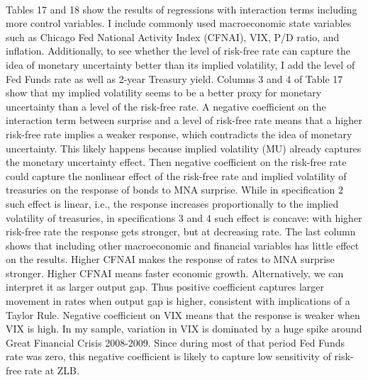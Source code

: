 \documentclass[12pt]{article}
\begin{document}
\paragraph{}
Tables 17 and 18 show the results of regressions with interaction terms including more control variables. I include commonly used macroeconomic state variables such as Chicago Fed National Activity Index (CFNAI), VIX, P/D ratio, and inflation. Additionally, to see whether the level of risk-free rate can capture the idea of monetary uncertainty better than its implied volatility, I add the level of Fed Funds rate as well as 2-year Treasury yield. Columns 3 and 4 of Table 17 show that my implied volatility seems to be a better proxy for monetary uncertainty than a level of the risk-free rate. A negative coefficient on the interaction term between surprise and a level of risk-free rate means that a higher risk-free rate implies a weaker response, which contradicts the idea of monetary uncertainty. This likely happens because implied volatility (MU) already captures the monetary uncertainty effect. Then negative coefficient on the risk-free rate could capture the nonlinear effect of the risk-free rate and implied volatility of treasuries on the response of bonds to MNA surprise. While in specification 2 such effect is linear, i.e., the response increases proportionally to the implied volatility of treasuries, in specifications 3 and 4 such effect is concave: with higher risk-free rate the response gets stronger, but at decreasing rate. The last column shows that including other macroeconomic and financial variables has little effect on the results. Higher CFNAI makes the response of rates to MNA surprise stronger. Higher CFNAI means faster economic growth. Alternatively, we can interpret it as larger output gap. Thus positive coefficient captures larger movement in rates when output gap is higher, consistent with implications of a Taylor Rule. Negative coefficient on VIX means that the response is weaker when VIX is high. In my sample, variation in VIX is dominated by a huge spike around Great Financial Crisis 2008-2009. Since during most of that period Fed Funds rate was zero, this negative coefficient is likely to capture low sensitivity of risk-free rate at ZLB.
\end{document}

